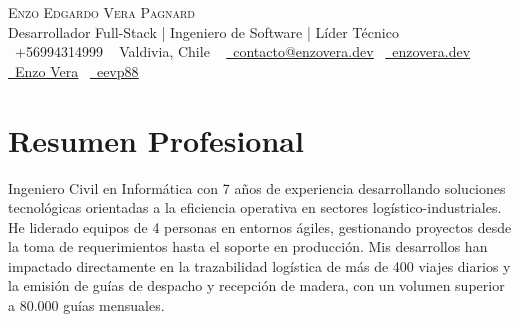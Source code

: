 \documentclass[letterpaper,11pt]{article}
\begin{document}

\begin{center}
    {\Huge \scshape Enzo Edgardo Vera Pagnard} \\ \vspace{1pt}
    Desarrollador Full-Stack | Ingeniero de Software | Líder Técnico\\ \vspace{1pt}
    \small \raisebox{-0.1\height}\faWhatsapp\ +56994314999 ~ 
    Valdivia, Chile ~ 
    \href{mailto:contacto@enzovera.dev}{\raisebox{-0.2\height}\faEnvelope\ \underline{contacto@enzovera.dev}}~ 
    \href{https://enzovera.dev/}{\raisebox{-0.2\height}\faDesktop\ \underline{enzovera.dev}}~ 
    \href{https://www.linkedin.com/in/enzoverapagnard/}{\raisebox{-0.2\height}\faLinkedin\ \underline{Enzo Vera}}~
    \href{https://github.com/eevp88}{\raisebox{-0.2\height}\faGithub\ \underline{eevp88}}
    \vspace{-8pt}
\end{center}


\section{Resumen Profesional}
\begin{justify}
Ingeniero Civil en Informática con 7 años de experiencia desarrollando soluciones tecnológicas orientadas a la eficiencia operativa en sectores logístico-industriales.  
He liderado equipos de 4 personas en entornos ágiles, gestionando proyectos desde la toma de requerimientos hasta el soporte en producción. 
Mis desarrollos han impactado directamente en la trazabilidad logística de más de 400 viajes diarios y la emisión de guías de despacho y recepción de madera, con un volumen superior a 80.000 guías mensuales.
\end{justify}
\end{document}
